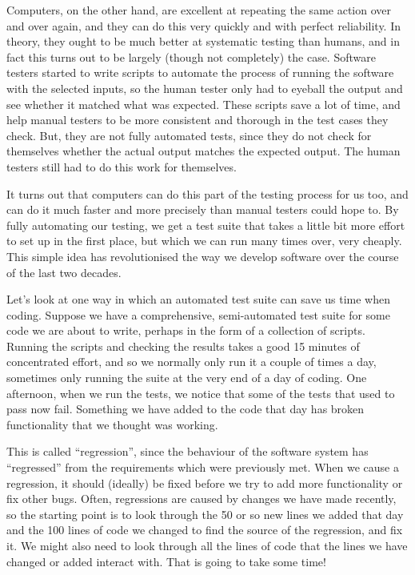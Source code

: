\documentclass[
]{book}
\begin{document}
Computers, on the other hand, are excellent at repeating the same action over and over again, and they can do this very quickly and with perfect reliability. In theory, they ought to be much better at systematic testing than humans, and in fact this turns out to be largely (though not completely) the case. Software testers started to write scripts to automate the process of running the software with the selected inputs, so the human tester only had to eyeball the output and see whether it matched what was expected. These scripts save a lot of time, and help manual testers to be more consistent and thorough in the test cases they check. But, they are not fully automated tests, since they do not check for themselves whether the actual output matches the expected output. The human testers still had to do this work for themselves.

It turns out that computers can do this part of the testing process for us too, and can do it much faster and more precisely than manual testers could hope to. By fully automating our testing, we get a test suite that takes a little bit more effort to set up in the first place, but which we can run many times over, very cheaply. This simple idea has revolutionised the way we develop software over the course of the last two decades.

Let's look at one way in which an automated test suite can save us time when coding. Suppose we have a comprehensive, semi-automated test suite for some code we are about to write, perhaps in the form of a collection of scripts. Running the scripts and checking the results takes a good 15 minutes of concentrated effort, and so we normally only run it a couple of times a day, sometimes only running the suite at the very end of a day of coding. One afternoon, when we run the tests, we notice that some of the tests that used to pass now fail. Something we have added to the code that day has broken functionality that we thought was working.

This is called ``regression'', since the behaviour of the software system has ``regressed'' from the requirements which were previously met. When we cause a regression, it should (ideally) be fixed before we try to add more functionality or fix other bugs. Often, regressions are caused by changes we have made recently, so the starting point is to look through the 50 or so new lines we added that day and the 100 lines of code we changed to find the source of the regression, and fix it. We might also need to look through all the lines of code that the lines we have changed or added interact with. That is going to take some time!
\end{document}

